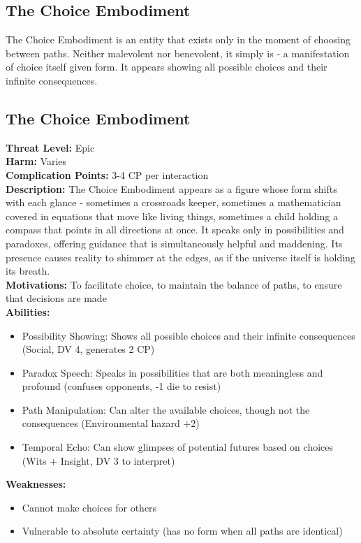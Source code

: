 \documentclass[11pt]{article}
\newenvironment{monsterentry}[1]{%
  \begin{mdframed}[backgroundcolor=shadecolor, linewidth=0pt, leftmargin=0pt, rightmargin=0pt]%
  \subsection*{#1}%
}{%
  \end{mdframed}%
}
\begin{document}
\subsection{The Choice Embodiment}

The Choice Embodiment is an entity that exists only in the moment of choosing between paths. Neither malevolent nor benevolent, it simply is - a manifestation of choice itself given form. It appears showing all possible choices and their infinite consequences.

\begin{monsterentry}{The Choice Embodiment}
\textbf{Threat Level:} Epic \\
\textbf{Harm:} Varies \\
\textbf{Complication Points:} 3-4 CP per interaction \\
\textbf{Description:} The Choice Embodiment appears as a figure whose form shifts with each glance - sometimes a crossroads keeper, sometimes a mathematician covered in equations that move like living things, sometimes a child holding a compass that points in all directions at once. It speaks only in possibilities and paradoxes, offering guidance that is simultaneously helpful and maddening. Its presence causes reality to shimmer at the edges, as if the universe itself is holding its breath. \\
\textbf{Motivations:} To facilitate choice, to maintain the balance of paths, to ensure that decisions are made \\
\textbf{Abilities:}
\begin{itemize}
    \item Possibility Showing: Shows all possible choices and their infinite consequences (Social, DV 4, generates 2 CP)
    \item Paradox Speech: Speaks in possibilities that are both meaningless and profound (confuses opponents, -1 die to resist)
    \item Path Manipulation: Can alter the available choices, though not the consequences (Environmental hazard +2)
    \item Temporal Echo: Can show glimpses of potential futures based on choices (Wits + Insight, DV 3 to interpret)
\end{itemize}
\textbf{Weaknesses:}
\begin{itemize}
    \item Cannot make choices for others
    \item Vulnerable to absolute certainty (has no form when all paths are identical)

\end{itemize}
\end{monsterentry}
\end{document}
